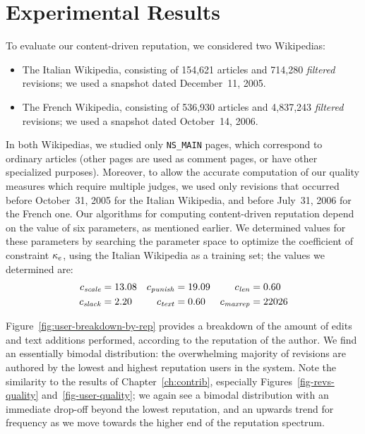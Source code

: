 \section{Experimental Results}

To evaluate our content-driven reputation, we considered two Wikipedias:
%
\begin{itemize}

\item The Italian Wikipedia, consisting of 154,621 articles and 714,280
  {\em filtered\/} revisions; we used a snapshot dated December~11, 2005.
\item The French Wikipedia, consisting of 536,930 articles and
  4,837,243 {\em filtered\/} revisions; we used a snapshot dated
  October~14, 2006.

\end{itemize}
%
In both Wikipedias, we studied only \texttt{NS\_MAIN} pages, which
correspond to ordinary articles (other pages are used as comment
pages, or have other specialized purposes).
Moreover, to allow the accurate computation of our quality
measures which require multiple judges,
we used only revisions that occurred before October~31, 2005 for
the Italian Wikipedia, and before July~31, 2006 for the French one.
Our algorithms for computing content-driven reputation depend on the
value of six parameters, as mentioned earlier.
We determined values for these parameters by searching the parameter
space to optimize the coefficient of constraint $\kappa_e$, using the Italian
Wikipedia as a training set; the values we determined are:
%
\begin{align*}
   {c_{{\text{\textit{scale}}}}}      & = 13.08
  & {c_{{\text{\textit{punish}}}}}   & = 19.09
  & {c_{{\text{\textit{len}}}}}     & = 0.60   \\
   {c_{{\text{\textit{slack}}}}}         & = 2.20
  & {c_{{\text{\textit{text}}}}}     & = 0.60
  & {c_{{\text{\textit{maxrep}}}}}   & = 22026
\end{align*}

Figure~\ref{fig:user-breakdown-by-rep} provides a breakdown of
the amount of edits and text additions performed, according to the
reputation of the author.
We find an essentially bimodal distribution:
the overwhelming majority of revisions are authored by the
lowest and highest reputation users in the system.
Note the similarity to the results of Chapter~\ref{ch:contrib},
especially Figures~\ref{fig-revs-quality} and~\ref{fig-user-quality};
we again see a bimodal distribution with an immediate drop-off beyond
the lowest reputation, and an upwards trend for frequency as we move
towards the higher end of the reputation spectrum.


